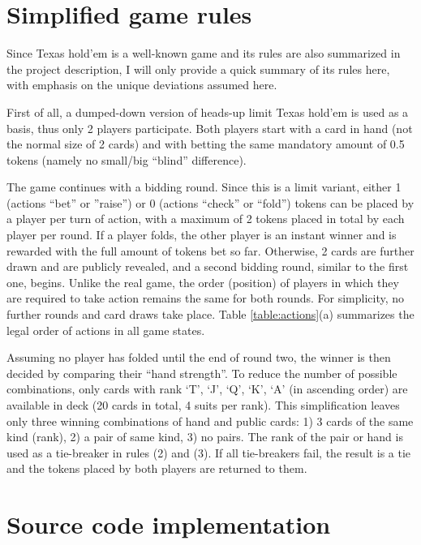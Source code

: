 \begin{appendices}

\section{Simplified game rules}
\label{app:rules}

Since Texas hold'em is a well-known game and its rules are also summarized in the project description, I will only provide a quick summary of its rules here, with emphasis on the unique deviations assumed here.

First of all, a dumped-down version of heads-up limit Texas hold'em is used as a basis, thus only 2 players participate. Both players start with a card in hand (not the normal size of 2 cards) and with betting the same mandatory amount of 0.5 tokens (namely no small/big ``blind'' difference). 

The game continues with a bidding round. Since this is a limit variant, either 1 (actions ``bet'' or ''raise'') or 0 (actions ``check'' or ``fold'') tokens can be placed by a player per turn of action, with a maximum of 2 tokens placed in total by each player per round. If a player folds, the other player is an instant winner and is rewarded with the full amount of tokens bet so far. Otherwise, 2 cards are further drawn and are publicly revealed, and a second bidding round, similar to the first one, begins. Unlike the real game, the order (position) of players in which they are required to take action remains the same for both rounds. For simplicity, no further rounds and card draws take place. Table \ref{table:actions}(a) summarizes the legal order of actions in all game states.

Assuming no player has folded until the end of round two, the winner is then decided by comparing their ``hand strength''. To reduce the number of possible combinations, only cards with rank `T', `J', `Q', `K', `A' (in ascending order) are available in deck (20 cards in total, 4 suits per rank). This simplification leaves only three winning combinations of hand and public cards: 1) 3 cards of the same kind (rank), 2) a pair of same kind, 3) no pairs. The rank of the pair or hand is used as a tie-breaker in rules (2) and (3). If all tie-breakers fail, the result is a tie and the tokens placed by both players are returned to them.

\section{Source code implementation}
\label{app:source}


\end{appendices}
